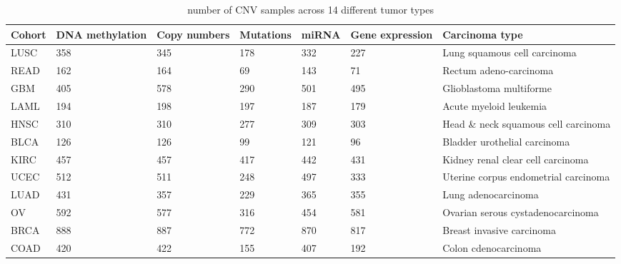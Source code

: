 \iffalse
\begin{table} [h]
\centering
    \scriptsize
    \caption{number of CNV samples across 14 different tumor types}
    \label{table:alldatadetails}
    \vspace{-2mm}
    \begin{tabular}{l|l|l|l}
        \hline
         \textbf{Cohort} & \textbf{DNA methylation} & \textbf{Copy numbers} & \textbf{Mutations} & \textbf{miRNA} & \textbf{Gene expression} & \textbf{Carcinoma type} \\\hline
            LUSC & 358 & 345 & 178 & 332 & 227 & Lung squamous cell carcinoma \\\hline
            READ & 162 & 164 & 69 & 143 & 71 & Rectum adeno-carcinoma \\%
            GBM  & 405 & 578 & 290 & 501 & 495 & Glioblastoma multiforme \\\hline
            LAML & 194 & 198 & 197 & 187 & 179 & Acute myeloid leukemia	\\%
            HNSC & 310 & 310 & 277 & 309 & 303 & Head \& neck squamous cell carcinoma \\\hline 
            BLCA & 126 & 126 & 99 & 121 & 96 & Bladder urothelial carcinoma \\\hline 
            KIRC & 457 & 457 & 417 & 442 & 431 & Kidney renal clear cell carcinoma  \\\hline
            UCEC & 512 & 511 & 248 & 497 & 333 & Uterine corpus endometrial carcinoma \\\hline
            LUAD & 431 & 357 & 229 & 365 & 355 & Lung adenocarcinoma \\\hline
            OV   & 592 & 577 & 316 & 454 & 581 & Ovarian serous cystadenocarcinoma \\\hline
            BRCA & 888 & 887 & 772 & 870 & 817 & Breast invasive carcinoma  \\\hline
            COAD & 420 & 422 & 155 & 407 & 192 & Colon cdenocarcinoma \\\hline
    \end{tabular}
\end{table}

